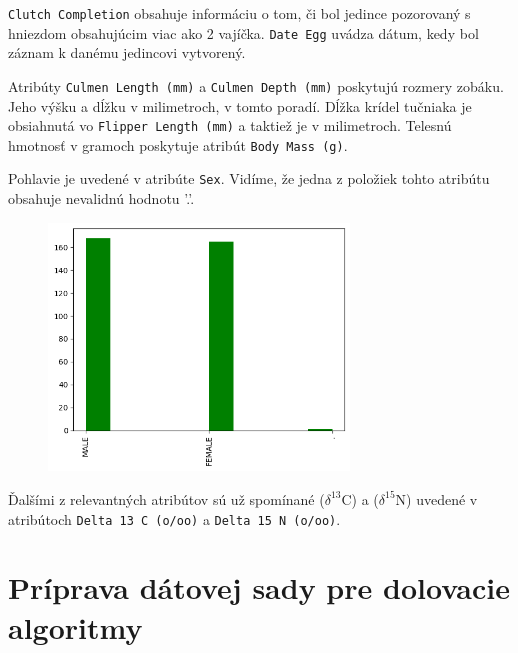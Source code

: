 \documentclass[10pt,xcolor=pdflatex,dvipsnames,table,oneside]{book}
\begin{document}
\texttt{Clutch Completion} obsahuje informáciu o tom, či bol jedince pozorovaný s hniezdom obsahujúcim viac ako 2 vajíčka. \texttt{Date Egg} uvádza dátum, kedy bol záznam k danému jedincovi vytvorený.

Atribúty \texttt{Culmen Length (mm)} a  \texttt{Culmen Depth (mm)} poskytujú rozmery zobáku. Jeho   výšku a dĺžku v milimetroch, v tomto poradí.
Dĺžka krídel tučniaka je obsiahnutá vo \texttt{Flipper Length (mm)} a taktiež je v milimetroch. Telesnú hmotnosť v gramoch poskytuje atribút \texttt{Body Mass (g)}.



\newpage
Pohlavie je uvedené v atribúte \texttt{Sex}. Vidíme, že jedna z položiek tohto atribútu obsahuje nevalidnú hodnotu '.'.

\begin{figure}[t]
\includegraphics[width=8cm]{img/the_thing.png}
\centering
\end{figure}

Ďalšími z relevantných atribútov sú už spomínané ($\delta^{13}$C) a ($\delta^{15}$N) uvedené v atribútoch \texttt{Delta 13 C (o/oo)} a \texttt{Delta 15 N (o/oo)}.

\chapter{Príprava dátovej sady pre dolovacie algoritmy}
\end{document}
